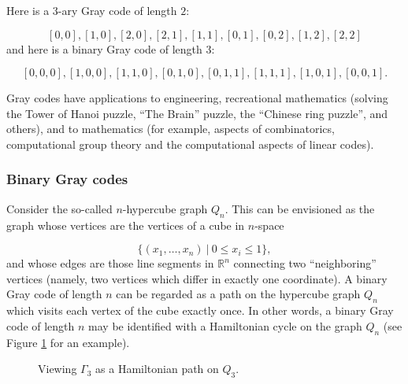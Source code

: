 \begin{example}
{\rm
Here is a $3$-ary Gray code of length $2$:

\[
[0, 0], [1, 0], [2, 0], [2, 1], [1, 1], [0, 1], [0, 2], [1, 2], [2, 2]
\]
and here is a binary Gray code of length $3$:

\[
[0, 0, 0], [1, 0, 0], [1, 1, 0], [0, 1, 0], [0, 1, 1], [1, 1, 1], [1, 0, 1], [0, 0, 1].
\]
}
\end{example}

Gray codes have applications to engineering,
recreational mathematics (solving the Tower of Hanoi
puzzle, ``The Brain'' puzzle, the ``Chinese ring puzzle'',
and others), and to mathematics (for example, aspects of
combinatorics, computational group theory
and the computational aspects of linear codes).

\subsubsection{Binary Gray codes}

Consider the so-called $n$-hypercube graph
$Q_n$. This can be envisioned as the graph whose
vertices are the vertices of a cube in
$n$-space

\[
\{(x_1,\dots,x_n)\ |\ 0\leq x_i\leq 1\},
\]
and whose edges are those line segments in
${\mathbb{R}}^n$ connecting two ``neighboring''
vertices (namely, two vertices which differ
in exactly one coordinate).
A binary Gray code of length $n$ can be regarded as a
path on the hypercube graph $Q_n$ which visits
each vertex of the cube exactly once.
In other words, a binary Gray code of length $n$
may be identified with a
Hamiltonian cycle on the graph $Q_n$
(see Figure \ref{fig:trees_forests:gray_code_cube} for an example).

\begin{figure}[!htbp]
\centering
{}
\caption{Viewing $\Gamma_3$ as a Hamiltonian path on $Q_3$.}
\label{fig:trees_forests:gray_code_cube}
\end{figure}


